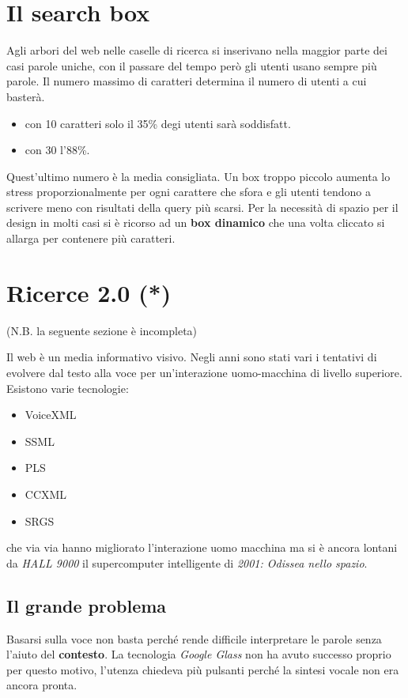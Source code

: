 	\section{Il search box}
		Agli arbori del web nelle caselle di ricerca si inserivano nella maggior parte dei casi parole uniche, con il passare del tempo però gli utenti usano sempre più parole. Il numero massimo di caratteri determina il numero di utenti a cui basterà.
		\begin{itemize}
			\item con 10 caratteri solo il 35\% degi utenti sarà soddisfatt.
			\item con 30 l'88\%.
		\end{itemize}
		Quest'ultimo numero è la media consigliata. Un box troppo piccolo aumenta lo stress proporzionalmente per ogni carattere che sfora e gli utenti tendono a scrivere meno con risultati della query più scarsi.
		Per la necessità di spazio per il design in molti casi si è ricorso ad un \textbf{box dinamico} che una volta cliccato si allarga per contenere più caratteri.
	
	\section{Ricerce 2.0 (*)}
		(N.B. la seguente sezione è incompleta)
		
		Il web è un media informativo visivo. Negli anni sono stati vari i tentativi di evolvere dal testo alla voce per un'interazione uomo-macchina di livello superiore. Esistono varie tecnologie:
		\begin{itemize}
			\item VoiceXML
			\item SSML
			\item PLS
			\item CCXML
			\item SRGS
		\end{itemize}
		che via via hanno migliorato l'interazione uomo macchina ma si è ancora lontani da \emph{HALL 9000} il supercomputer intelligente di \emph{2001: Odissea nello spazio}.
		
		\subsection{Il grande problema}
			Basarsi sulla voce non basta perché rende difficile interpretare le parole senza l'aiuto del \textbf{contesto}.
			La tecnologia \emph{Google Glass} non ha avuto successo proprio per questo motivo, l'utenza chiedeva più pulsanti perché la sintesi vocale non era ancora pronta.
			
